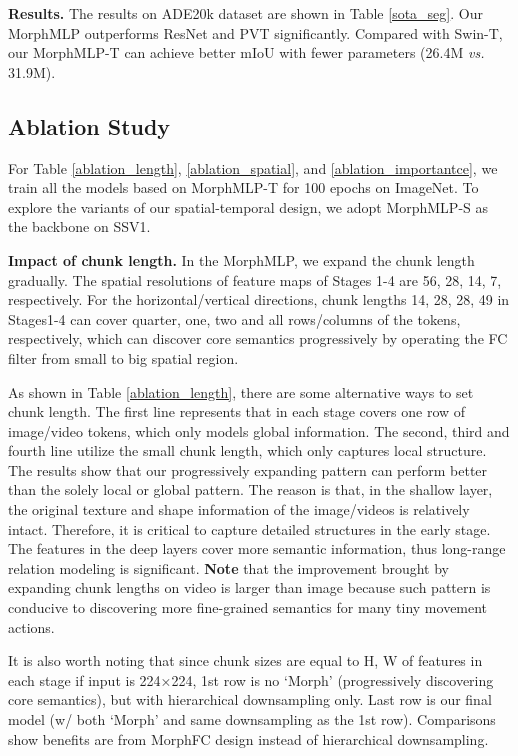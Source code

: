 \documentclass[runningheads]{llncs}
\begin{document}
\noindent\textbf{Results.} 
The results on ADE20k dataset are shown in Table \ref{sota_seg}. Our MorphMLP outperforms ResNet\cite{regnet} and PVT\cite{pvt} significantly. Compared with Swin-T, our MorphMLP-T can achieve better mIoU  with fewer parameters (26.4M \textit{vs.}  31.9M). 

\subsection{Ablation Study}
For Table \ref{ablation_length}, \ref{ablation_spatial}, and \ref{ablation_importantce},
we train all the models based on MorphMLP-T for 100 epochs on ImageNet. To explore the variants of our spatial-temporal design,  we adopt {MorphMLP}-S as the backbone on SSV1.




\noindent
\textbf{Impact of chunk length.} 
In the MorphMLP, we expand the chunk length gradually.
The spatial resolutions of feature maps of Stages 1-4 are 56, 28, 14, 7, respectively. For the horizontal/vertical directions, chunk lengths 14, 28, 28, 49 in Stages1-4 can cover quarter, one, two and all rows/columns of the tokens, respectively, which can discover core semantics  progressively by operating the FC filter from small to big spatial region. 

As shown in Table \ref{ablation_length}, there are some alternative ways to set chunk length.  The first line represents that  in each stage covers one row of image/video tokens, which only models global information. The second, third  and fourth line utilize the small chunk length, which only captures local structure.  The results show that our progressively expanding  pattern can perform better than the solely local or global pattern.   The reason is that, in the shallow layer, the original texture and shape information of the image/videos is relatively intact. Therefore, it is critical to capture detailed structures in the early stage.  The features in the deep layers cover more semantic information, thus long-range relation modeling is significant. \textbf{Note} that the improvement brought by expanding chunk lengths on video is larger than image because such pattern is conducive to discovering more fine-grained semantics for many tiny movement actions.  

It is also worth noting that since chunk sizes are equal to H, W of features in
each stage if input is 224×224, 1st row is no
`Morph’ (progressively discovering core semantics), but with hierarchical downsampling only. Last row is our final model (w/ both
`Morph’ and same downsampling as the 1st row). Comparisons show benefits are from MorphFC design instead of hierarchical downsampling.
\end{document}
